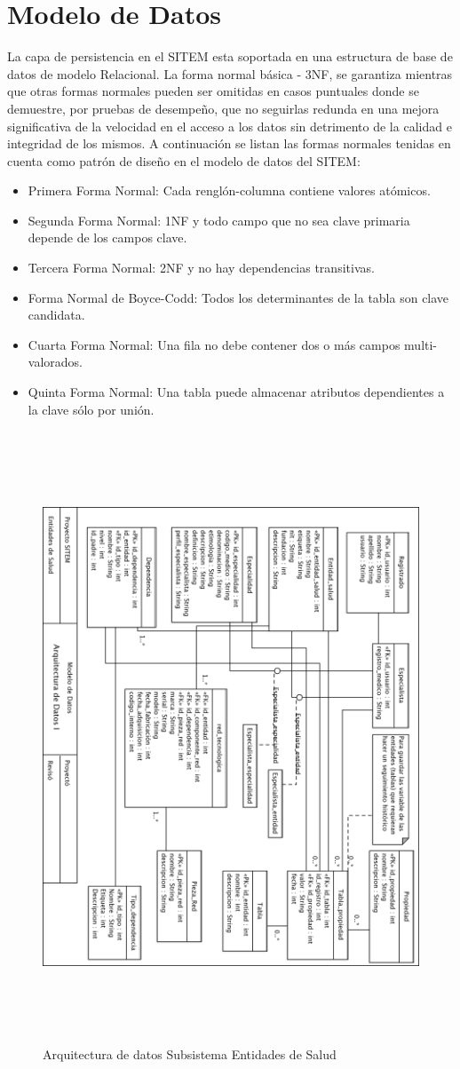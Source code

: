\chapter{Modelo de Datos}
\label{modelo_datos}

La capa de persistencia en el SITEM esta soportada en una estructura de base de datos de modelo Relacional. La forma normal básica - 3NF, se garantiza mientras que otras formas normales pueden ser omitidas en casos puntuales donde se demuestre, por pruebas de desempeño, que no seguirlas redunda en una mejora significativa de la velocidad en el acceso a los datos sin detrimento de la calidad e integridad de los mismos. A continuación se listan las formas normales tenidas en cuenta como patrón de diseño en el modelo de datos del SITEM:

\begin{itemize}
\item Primera Forma Normal: Cada renglón-columna contiene valores atómicos.
\item Segunda Forma Normal: 1NF y todo campo que no sea clave primaria depende de los campos clave.
\item Tercera Forma Normal: 2NF y no hay dependencias transitivas.
\item Forma Normal de Boyce-Codd: Todos los determinantes de la tabla son clave candidata.
\item Cuarta Forma Normal:  Una fila no debe contener dos o más campos multi-valorados.
\item Quinta Forma Normal: Una tabla puede almacenar atributos dependientes a la clave sólo por unión.
\end{itemize}

\begin{figure}
 \centering
 \includegraphics[width=156mm, height=182mm]{datos_entidad.png}
 \caption{Arquitectura de datos Subsistema Entidades de Salud}
 \label{mapanavegacion}
\end{figure}